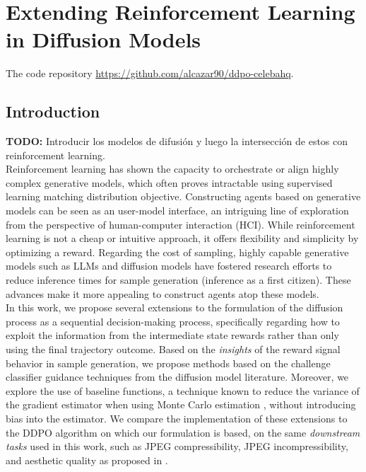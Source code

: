 \chapter{Extending Reinforcement Learning in Diffusion Models}

The code repository \href{https://github.com/alcazar90/ddpo-celebahq}{https://github.com/alcazar90/ddpo-celebahq}.

\section{Introduction}

\textbf{TODO:} Introducir los modelos de difusión y luego la intersección de
estos con reinforcement learning. \\

Reinforcement learning has shown the capacity to orchestrate or align highly complex generative models, which often proves intractable using supervised learning matching distribution objective. Constructing agents based on generative models can be seen as an user-model interface, an intriguing line of exploration from the perspective of human-computer interaction (HCI). While reinforcement learning is not a cheap or intuitive approach, it offers flexibility and simplicity by optimizing a reward. Regarding the cost of sampling, highly capable generative models such as LLMs and diffusion models have fostered research efforts to reduce inference times for sample generation (inference as a first citizen). These advances make it more appealing to construct agents atop these models. \\

In this work, we propose several extensions to the formulation of the diffusion process as a sequential decision-making process, specifically regarding how to exploit the information from the intermediate state rewards rather than only using the final trajectory outcome. Based on the \textit{insights} of the reward signal behavior in sample generation, we propose methods based on the challenge classifier guidance techniques from the diffusion model literature. Moreover, we explore the use of baseline functions, a technique known to reduce the variance of the gradient estimator when using Monte Carlo estimation \cite{mohamed2020monte}, without introducing bias into the estimator. We compare the implementation of these extensions to the DDPO algorithm \cite{black2023training} on which our formulation is based, on the same \textit{downstream tasks} used in this work, such as JPEG compressibility, JPEG incompressibility, and aesthetic quality as proposed in \cite{black2023training}. \\

